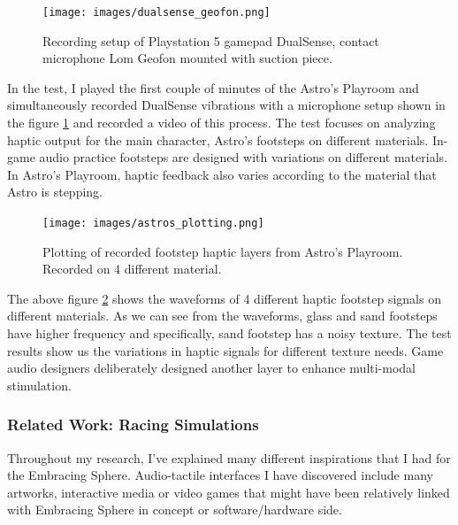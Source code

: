                 \begin{figure}[H]
                    \centering
                    \texttt{[image: images/dualsense\_geofon.png]}
                    \caption{Recording setup of Playstation 5 gamepad DualSense, contact microphone Lom Geofon mounted with suction piece.}
                    \label{fig:DUALSENSE_GEOFON}
                \end{figure}

                In the test, I played the first couple of minutes of the Astro's Playroom and simultaneously recorded DualSense vibrations with a microphone setup shown in the figure \ref{fig:DUALSENSE_GEOFON} and recorded a video of this process. The test focuses on analyzing haptic output for the main character, Astro's footsteps on different materials. In-game audio practice footsteps are designed with variations on different materials\cite{Princibles_of_Game_Audio_and_Sound_Design}. In Astro's Playroom, haptic feedback also varies according to the material that Astro is stepping.\par

                \begin{figure}[H]
                    \centering
                    \texttt{[image: images/astros\_plotting.png]}
                    \caption{Plotting of recorded footstep haptic layers from Astro's Playroom. Recorded on 4 different material.}
                    \label{fig:ASTROS_FS}
                \end{figure}

                The above figure \ref{fig:ASTROS_FS} shows the waveforms of 4 different haptic footstep signals on different materials. As we can see from the waveforms, glass and sand footsteps have higher frequency and specifically, sand footstep has a noisy texture. The test results show us the variations in haptic signals for different texture needs. Game audio designers deliberately designed another layer to enhance multi-modal stimulation.\par
            \subsubsection{Related Work: Racing Simulations}
                Throughout my research, I've explained many different inspirations that I had for the Embracing Sphere. Audio-tactile interfaces I have discovered include many artworks, interactive media or video games that might have been relatively linked with Embracing Sphere in concept or software/hardware side.\par

